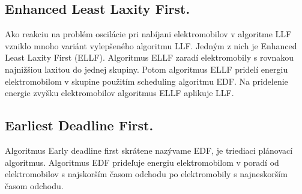 






\subsection{Enhanced Least Laxity First.}
Ako reakciu na problém oscilácie pri nabíjani elektromobilov v algoritme LLF vzniklo mnoho variánt vylepšeného algoritmu LLF. Jedným z nich je Enhanced Least Laxity First (ELLF). Algoritmus ELLF zaradí elektromobily s rovnakou najnižšiou laxitou do jednej skupiny. Potom algoritmus ELLF pridelí energiu elektromobilom v skupine použitím  scheduling algoritmu EDF. Na pridelenie energie zvyšku elektromobilov algoritmus ELLF aplikuje LLF. \cite{websiteenhancedllf}

\subsection{Earliest Deadline First.}
Algoritmus Early deadline first skrátene nazývame EDF, je triediaci plánovací algoritmus. Algoritmus EDF prideľuje energiu elektromobilom v poradí od elektromobilov s najskorším časom odchodu po elektromobily s najneskorším časom odchodu. \cite{lee2021acnsim}



